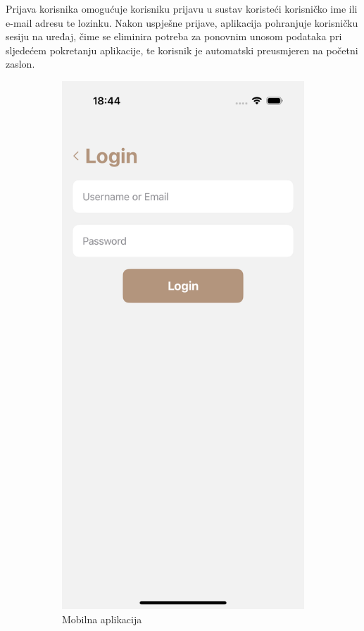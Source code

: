 Prijava korisnika omogućuje korisniku prijavu u sustav koristeći korisničko ime ili e-mail adresu te lozinku. Nakon uspješne prijave, aplikacija pohranjuje korisničku sesiju na uređaj, čime se eliminira potreba za ponovnim unosom podataka pri sljedećem pokretanju aplikacije, te korisnik je automatski preusmjeren na početni zaslon.

\begin{figure}[H]
\centering
\begin{subfigure}{.5\textwidth}
  \centering
  \includegraphics[width=0.7\linewidth]{images/implementacija/login.png}
  \caption{Mobilna aplikacija}
  \label{fig:prijava1}
\end{subfigure}%
\begin{subfigure}{.5\textwidth}
  \centering

\end{subfigure}
\end{figure}
